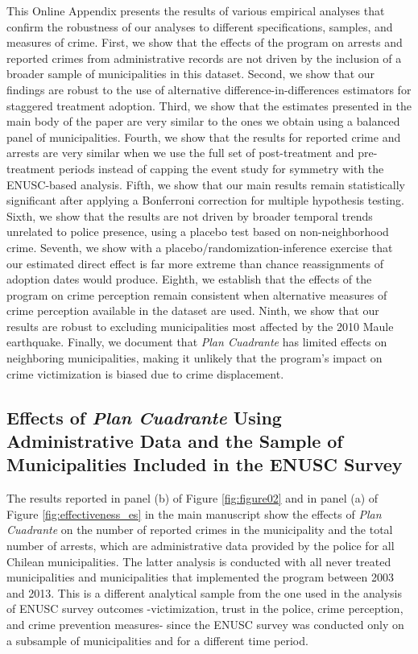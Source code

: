 This Online Appendix presents the results of various empirical analyses that confirm the robustness of our analyses to different specifications, samples, and measures of crime. First, we show that the effects of the program on arrests and reported crimes from administrative records are not driven by the inclusion of a broader sample of municipalities in this dataset. Second, we show that our findings are robust to the use of alternative difference-in-differences estimators for staggered treatment adoption. Third, we show that the estimates presented in the main body of the paper are very similar to the ones we obtain using a balanced panel of municipalities. Fourth, we show that the results for reported crime and arrests are very similar when we use the full set of post-treatment and pre-treatment periods instead of capping the event study for symmetry with the ENUSC-based analysis. Fifth, we show that our main results remain statistically significant after applying a Bonferroni correction for multiple hypothesis testing. Sixth, we show that the results are not driven by broader temporal trends unrelated to police presence, using a placebo test based on non-neighborhood crime. Seventh, we show with a placebo/randomization-inference exercise that our estimated direct effect is far more extreme than chance reassignments of adoption dates would produce. Eighth, we establish that the effects of the program on crime perception remain consistent when alternative measures of crime perception available in the dataset are used. Ninth, we show that our results are robust to excluding municipalities most affected by the 2010 Maule earthquake. Finally, we document that \emph{Plan Cuadrante} has limited effects on neighboring municipalities, making it unlikely that the program’s impact on crime victimization is biased due to crime displacement.

\subsection{Effects of \emph{Plan Cuadrante} Using Administrative Data and the Sample of Municipalities Included in the ENUSC Survey}

The results reported in panel (b) of Figure \ref{fig:figure02} and in panel (a) of Figure \ref{fig:effectiveness_es} in the main manuscript show the effects of \emph{Plan Cuadrante} on the number of reported crimes in the municipality and the total number of arrests, which are administrative data provided by the police for all Chilean municipalities. The latter analysis is conducted with all never treated municipalities and municipalities that implemented the program between 2003 and 2013. This is a different analytical sample from the one used in the analysis of ENUSC survey outcomes -victimization, trust in the police, crime perception, and crime prevention measures- since the ENUSC survey was conducted only on a subsample of municipalities and for a different time period.

